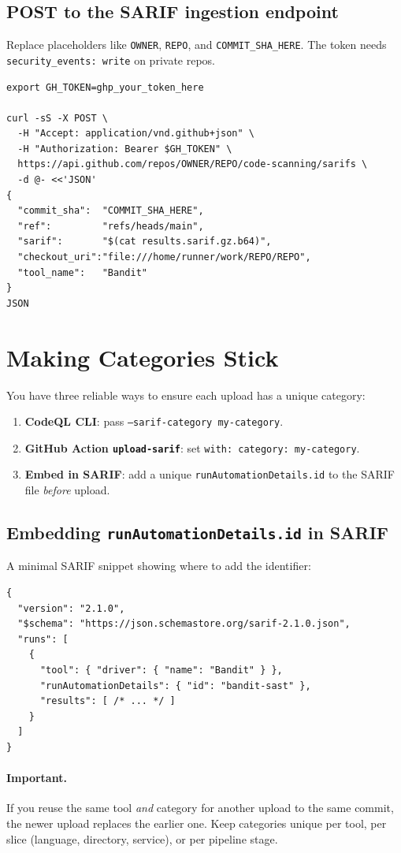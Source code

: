 \documentclass[11pt,a4paper]{article}
\providecommand{\term}[1]{\texttt{#1}}
\begin{document}
\subsection{POST to the SARIF ingestion endpoint}
Replace placeholders like \term{OWNER}, \term{REPO}, and \term{COMMIT\_SHA\_HERE}. The token needs \term{security\_events: write} on private repos.
\begin{verbatim}
export GH_TOKEN=ghp_your_token_here

curl -sS -X POST \
  -H "Accept: application/vnd.github+json" \
  -H "Authorization: Bearer $GH_TOKEN" \
  https://api.github.com/repos/OWNER/REPO/code-scanning/sarifs \
  -d @- <<'JSON'
{
  "commit_sha":  "COMMIT_SHA_HERE",
  "ref":         "refs/heads/main",
  "sarif":       "$(cat results.sarif.gz.b64)",
  "checkout_uri":"file:///home/runner/work/REPO/REPO",
  "tool_name":   "Bandit"
}
JSON
\end{verbatim}

\section{Making Categories Stick}
You have three reliable ways to ensure each upload has a unique category:
\begin{enumerate}
  \item \textbf{CodeQL CLI}: pass \term{--sarif-category my-category}.
  \item \textbf{GitHub Action \term{upload-sarif}}: set \term{with: category: my-category}.
  \item \textbf{Embed in SARIF}: add a unique \term{runAutomationDetails.id} to the SARIF file \emph{before} upload.
\end{enumerate}
\clearpage

\subsection{Embedding \texttt{runAutomationDetails.id} in SARIF}
A minimal SARIF snippet showing where to add the identifier:
\begin{verbatim}
{
  "version": "2.1.0",
  "$schema": "https://json.schemastore.org/sarif-2.1.0.json",
  "runs": [
    {
      "tool": { "driver": { "name": "Bandit" } },
      "runAutomationDetails": { "id": "bandit-sast" },
      "results": [ /* ... */ ]
    }
  ]
}
\end{verbatim}

\paragraph{Important.} If you reuse the same tool \emph{and} category for another upload to the same commit, the newer upload replaces the earlier one. Keep categories unique per tool, per slice (language, directory, service), or per pipeline stage.
\end{document}
